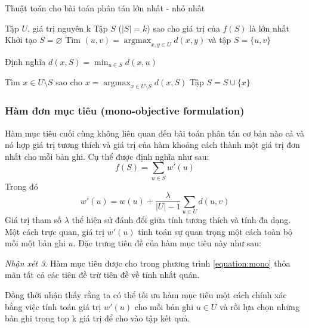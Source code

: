 \documentclass[12pt]{report}
\DeclareMathOperator*{\argmax}{argmax}
\begin{document}
\begin{algorithm}
    \caption{Thuật toán cho bài toán phân tán lớn nhất - nhỏ nhất}
    \label{alg:2}
    \begin{algorithmic}
        \INPUT Tập $U$, giá trị nguyên k 
        \OUTPUT Tập $S$ ($|S|=k$) sao cho giá trị của $f(S)$ là lớn nhất
        \State Khởi tạo $S = \varnothing$
        \State Tìm $(u, v) = \argmax_{x, y \in U} d(x, y)$ 
        và tập $S = \{ u, v\}$

            \State Định nghĩa $d(x, S) = \min_{u \in S} d(x, u)$
        \EndFor

            \State Tìm $x \in U \setminus S$ sao cho
            $x = \argmax_{x \in U \setminus S} d(x, S)$
            \State Tập $S = S \cup \{ x \}$
        \EndWhile
    \end{algorithmic}
\end{algorithm}

\subsubsection{Hàm đơn mục tiêu (mono-objective formulation)}
Hàm mục tiêu cuối cùng không liên quan đến bài toán phân tán cơ bản nào 
cả và nó hợp giá trị tương thích và giá trị của hàm khoảng cách 
thành một giá trị đơn nhất cho mỗi bản ghi.
Cụ thể được định nghĩa như sau: 
\begin{equation}
    \label{equation:mono}
    f(S) = \sum_{u \in S} w'(u)
\end{equation}
Trong đó
$$
w'(u) = w(u) + \frac{\lambda}{|U| - 1}
\sum_{u \in U} d(u, v)
$$
Giá trị tham số $\lambda$ thể hiện sử đánh đổi giữa tính tương thích 
và tính đa dạng. 
Một cách trực quan, giá trị $w'(u)$ tính toán sự quan trọng một cách toàn bộ mỗi một bản ghi $u$. Đặc trưng tiên đề của hàm mục tiêu này như sau:

\textit{Nhận xét 3}. Hàm mục tiêu được cho trong phương trình 
\ref{equation:mono} thỏa mãn tất cả các tiên đề trừ tiên đề về tính 
nhất quán.

Đồng thời nhận thấy rằng ta có thể tối ưu hàm mục tiêu một cách chính xác bằng việc tính toán giá trị $w'(u)$ cho mỗi bản ghi $u \in U$ và rồi lựa chọn những bản ghi trong top k giá trị để cho vào tập kết quả. 

\newpage
\end{document}
